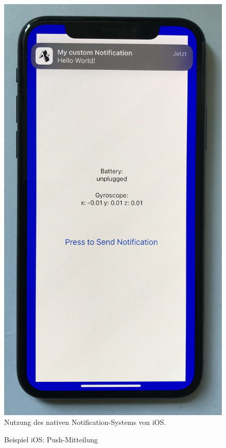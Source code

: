 \documentclass[a4paper]{scrartcl}
\begin{document}
\begin{figure}[H]
	\centering
	\caption{Beispiel iOS: Push-Mitteilung}
	\includegraphics[scale=0.08]{_assets/iOS_push_notification.jpg} \\
	\justifying
	\small	
	Nutzung des nativen Notification-Systems von iOS. 
\end{figure}
\end{document}
